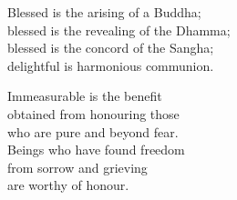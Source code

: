 Blessed is the arising of a Buddha;\\
blessed is the revealing of the Dhamma;\\
blessed is the concord of the Sangha;\\
delightful is harmonious communion.


Immeasurable is the benefit\\
obtained from honouring those\\
who are pure and beyond fear.\\
Beings who have found freedom\\
from sorrow and grieving\\
are worthy of honour.


